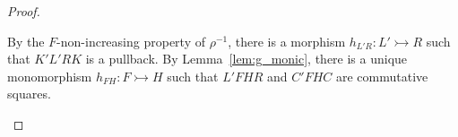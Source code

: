 \begin{proof}
\begin{itemize}
     By the $F$-non-increasing property of $\rho^{-1}$,  
     there is a morphism $h_{L'R} \mathop{\colon} L' \rightarrowtail R$ such that $K'L'RK$ is a pullback.
        By Lemma~\ref{lem:g_monic}, there is a unique monomorphism $h_{FH} \mathop{\colon} F \rightarrowtail H$ such that $L'FHR$ and $C'FHC$ are commutative squares.


\end{itemize}
\end{proof}
